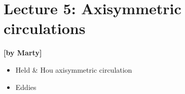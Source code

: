 
\section{Lecture 5: Axisymmetric circulations}\label{sec:lecture5}
\begin{flushright}\textbf{[by Marty]}\end{flushright}
  
 \begin{itemize}
   \item
   Held \& Hou axisymmetric circulation
   \item
   Eddies
\end{itemize}

